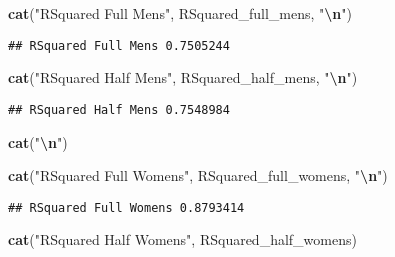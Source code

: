 \documentclass[
]{article}
\newenvironment{Shaded}{\begin{snugshade}}{\end{snugshade}}
\newcommand{\FunctionTok}[1]{\textcolor[rgb]{0.13,0.29,0.53}{\textbf{#1}}}
\newcommand{\NormalTok}[1]{#1}
\newcommand{\SpecialCharTok}[1]{\textcolor[rgb]{0.81,0.36,0.00}{\textbf{#1}}}
\newcommand{\StringTok}[1]{\textcolor[rgb]{0.31,0.60,0.02}{#1}}
\begin{document}
\begin{Shaded}
\begin{Highlighting}[]
\FunctionTok{cat}\NormalTok{(}\StringTok{"RSquared Full Mens"}\NormalTok{, RSquared\_full\_mens, }\StringTok{"}\SpecialCharTok{\textbackslash{}n}\StringTok{"}\NormalTok{)}
\end{Highlighting}
\end{Shaded}

\begin{verbatim}
## RSquared Full Mens 0.7505244
\end{verbatim}

\begin{Shaded}
\begin{Highlighting}[]
\FunctionTok{cat}\NormalTok{(}\StringTok{"RSquared Half Mens"}\NormalTok{, RSquared\_half\_mens, }\StringTok{"}\SpecialCharTok{\textbackslash{}n}\StringTok{"}\NormalTok{)}
\end{Highlighting}
\end{Shaded}

\begin{verbatim}
## RSquared Half Mens 0.7548984
\end{verbatim}

\begin{Shaded}
\begin{Highlighting}[]
\FunctionTok{cat}\NormalTok{(}\StringTok{"}\SpecialCharTok{\textbackslash{}n}\StringTok{"}\NormalTok{)}
\end{Highlighting}
\end{Shaded}

\begin{Shaded}
\begin{Highlighting}[]
\FunctionTok{cat}\NormalTok{(}\StringTok{"RSquared Full Womens"}\NormalTok{, RSquared\_full\_womens, }\StringTok{"}\SpecialCharTok{\textbackslash{}n}\StringTok{"}\NormalTok{)}
\end{Highlighting}
\end{Shaded}

\begin{verbatim}
## RSquared Full Womens 0.8793414
\end{verbatim}

\begin{Shaded}
\begin{Highlighting}[]
\FunctionTok{cat}\NormalTok{(}\StringTok{"RSquared Half Womens"}\NormalTok{, RSquared\_half\_womens)}
\end{Highlighting}
\end{Shaded}
\end{document}
